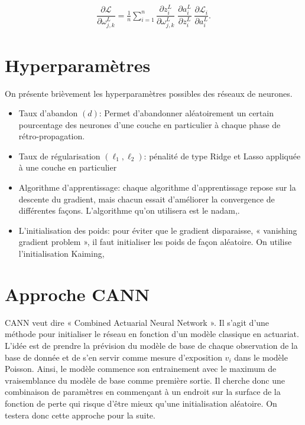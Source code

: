 \begin{align*}
\dfrac{\partial \mathcal{L}}{\partial \omega_{j,k}^L} =  \frac{1}{n} \sum _{i=1}^n\dfrac{\partial z^{L}_i }{\partial \omega_{j,k}^L} \;\dfrac{\partial a^L_i}{\partial z^{L}_i} \; \dfrac{\partial \mathcal{L}_i}{\partial a^L_i}.
\end{align*} 



\section{Hyperparamètres}
\label{sec:RN:hyperparametres}

On présente brièvement les hyperparamètres possibles des réseaux de neurones.

\begin{itemize}
\item Taux d'abandon $(d)$: Permet d'abandonner aléatoirement un certain pourcentage des neurones d'une couche en particulier à chaque phase de rétro-propagation.
\item Taux de régularisation $(\ell_1, \ell_2)$: pénalité de type Ridge et Lasso appliquée à une couche en particulier
\item Algorithme d'apprentissage: chaque algorithme d'apprentissage repose sur la descente du gradient, mais chacun essait d'améliorer la convergence de différentes façons. L'algorithme qu'on utilisera est le nadam,\citep{nadam}.
\item L'initialisation des poids: pour éviter que le gradient disparaisse, « vanishing gradient problem », il faut initialiser les poids de façon aléatoire. On utilise l'initialisation Kaiming, \citep{heinitializer}
\end{itemize}


\section{Approche CANN}

CANN veut dire « Combined Actuarial Neural Network ». Il s'agit d'une méthode pour initialiser le réseau en fonction d'un modèle classique en actuariat. L'idée est de prendre la prévision du modèle de base  de chaque observation de la base de donnée et de s'en servir comme mesure d'exposition $v_i$ dans le modèle Poisson. Ainsi, le modèle commence son entrainement avec le maximum de vraisemblance du modèle de base comme première sortie. Il cherche donc une combinaison de paramètres en commençant à un endroit sur la surface de la fonction de perte qui risque d'être mieux qu'une initialisation aléatoire. On testera donc cette approche pour la suite.
